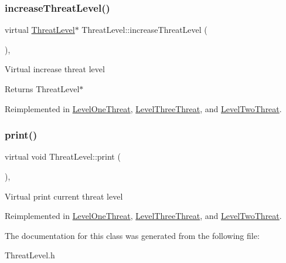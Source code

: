\mbox{\label{classThreatLevel_ae18f6ebe2186ae1b61d4817196f969e3}} 
\subsubsection{\texorpdfstring{increase\+Threat\+Level()}{increaseThreatLevel()}}
{\footnotesize\ttfamily virtual \hyperlink{classThreatLevel}{Threat\+Level}$\ast$ Threat\+Level\+::increase\+Threat\+Level (\begin{DoxyParamCaption}{ }\end{DoxyParamCaption})\hspace{0.3cm}{\ttfamily [inline]}, {\ttfamily [virtual]}}

Virtual increase threat level \begin{DoxyReturn}{Returns}
Threat\+Level$\ast$ 
\end{DoxyReturn}


Reimplemented in \hyperlink{classLevelOneThreat_afc68f742f1101cb8d533d8cec21bac3f}{Level\+One\+Threat}, \hyperlink{classLevelThreeThreat_a284c2b79a9a85f5e164f15c258c6e9ca}{Level\+Three\+Threat}, and \hyperlink{classLevelTwoThreat_a54b4d396cdd27504f1a8063c04be5bcf}{Level\+Two\+Threat}.

\mbox{\label{classThreatLevel_a5bdff5eeffed8db616ca06091097c138}} 
\subsubsection{\texorpdfstring{print()}{print()}}
{\footnotesize\ttfamily virtual void Threat\+Level\+::print (\begin{DoxyParamCaption}{ }\end{DoxyParamCaption})\hspace{0.3cm}{\ttfamily [inline]}, {\ttfamily [virtual]}}

Virtual print current threat level 

Reimplemented in \hyperlink{classLevelOneThreat_a902492d8341a398b0209fb89e2aca68e}{Level\+One\+Threat}, \hyperlink{classLevelThreeThreat_a3bdd7e61f3938123ce9c705623e0d98a}{Level\+Three\+Threat}, and \hyperlink{classLevelTwoThreat_a9e21bc1a55bb25d86346c484f5fd0525}{Level\+Two\+Threat}.



The documentation for this class was generated from the following file\+:\begin{DoxyCompactItemize}
\item 
Threat\+Level.\+h\end{DoxyCompactItemize}
